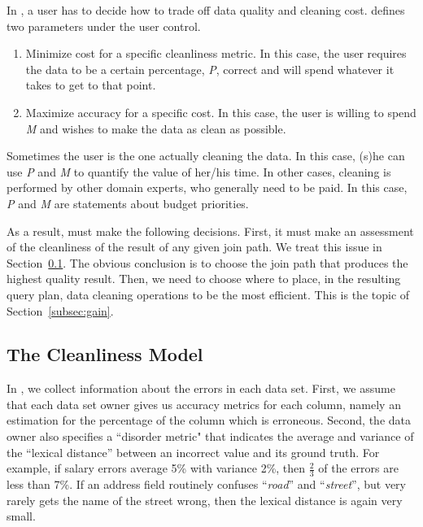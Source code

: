 In \dcv, a user has to decide how to trade off data quality and cleaning cost. 
\dcv defines two parameters under the user control.

\begin{enumerate}
\item Minimize cost for a specific cleanliness metric. In this case, the user requires the data to be a certain percentage, \emph{P}, correct and will spend whatever it takes to get to that point.

\item Maximize accuracy for a specific cost. In this case, the user is willing to spend \emph{M} and wishes to make the data as clean as possible.
\end{enumerate}


Sometimes the user is the one actually cleaning the data. In this case, (s)he can use \emph{P} and \emph{M} to quantify the value of her/his time. 
In other cases, cleaning is performed by other domain experts, who generally need to be paid. In this case, \emph{P} and \emph{M} are statements about budget priorities.



As a result, \dcv must make the following decisions.  First, it must make an assessment of the cleanliness of the result of any given join path.  We treat this issue in Section~\ref{subsec:model}. The obvious conclusion is to choose the join path that produces the highest quality result.
Then, we need to choose where to place,  in the resulting query plan, data cleaning operations to be the most efficient.  This is the topic of Section~\ref{subsec:gain}.


\subsection{The Cleanliness Model}
\label{subsec:model}

In \dcv, we collect information about the errors in each data set. 
First, we assume that each data set owner gives us accuracy metrics for each column, namely an estimation for the percentage of the column which is erroneous. 
Second, the data owner also specifies a ``disorder metric" that indicates the average and variance of the ``lexical distance'' between an incorrect value and its ground truth. 
For example, if salary errors average 5\% with variance 2\%, then $\frac{2}{3}$  of the errors are less than 7\%. 
If an address field routinely confuses ``\textit{road}'' and ``\textit{street}'', but very rarely gets the name of the street wrong, then the lexical distance is again very small.

